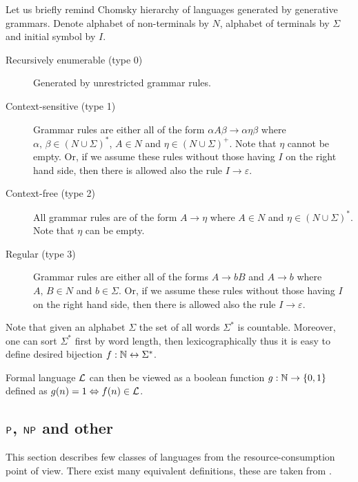 		Let us briefly remind Chomsky hierarchy of languages generated by generative grammars. Denote alphabet of non-terminals by $N$, alphabet of terminals by $\Sigma$ and initial symbol by $I$.
		\begin{description}
			\item[Recursively enumerable (type 0)] Generated by unrestricted grammar rules.
			\item[Context-sensitive (type 1)] Grammar rules are either all of the form $\alpha A \beta \rightarrow \alpha \eta \beta$ where $\alpha,\,\beta\in (N\cup\Sigma)^*$, $A\in N$ and $\eta\in (N\cup\Sigma)^+$. Note that $\eta$ cannot be empty. Or, if we assume these rules without those having $I$ on the right hand side, then there is allowed also the rule $I\rightarrow \varepsilon$.
			\item[Context-free (type 2)] All grammar rules are of the form $A\rightarrow\eta$ where $A\in N$ and $\eta\in (N\cup\Sigma)^*$. Note that $\eta$ can be empty.
			\item[Regular (type 3)] Grammar rules are either all of the forms $A\rightarrow bB$ and $A\rightarrow b$ where $A,\,B\in N$ and $b\in\Sigma$. Or, if we assume these rules without those having $I$ on the right hand side, then there is allowed also the rule $I\rightarrow \varepsilon$.
		\end{description}
		
		\begin{remark}
			Note that given an alphabet $\Sigma$ the set of all words $\Sigma^*$ is countable. Moreover, one can sort $\Sigma^*$ first by word length, then lexicographically thus it is easy to define desired bijection $f: \N \leftrightarrow \Sigma^* $.
			
			Formal language ${\cal L}$ can then be viewed as a boolean function $g: \N \rightarrow \{0,1\}$ defined as
			$g(n) = 1 \iff f(n)\in {\cal L}$.
		\end{remark}
		
	
	\subsection{$\P$, $\NP$ and other}
	\label{sec:PNP}
		
		This section describes few classes of languages from the resource-consumption point of view. There exist many equivalent definitions, these are taken from \cite{book_comp}. %
		
